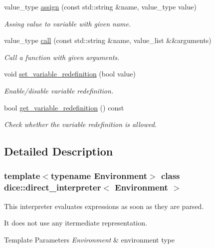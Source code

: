\begin{DoxyCompactItemize}
value\+\_\+type \mbox{\hyperlink{classdice_1_1direct__interpreter_a8ec5df422b6b9175987b7f93c4dd0d7b}{assign}} (const std\+::string \&name, value\+\_\+type value)
\begin{DoxyCompactList}\small\item\em Assing value to variable with given name. \end{DoxyCompactList}\item 
value\+\_\+type \mbox{\hyperlink{classdice_1_1direct__interpreter_afc6a69ed8b3eebb61fc41bccfc7ce725}{call}} (const std\+::string \&name, value\+\_\+list \&\&arguments)
\begin{DoxyCompactList}\small\item\em Call a function with given arguments. \end{DoxyCompactList}\item 
void \mbox{\hyperlink{classdice_1_1direct__interpreter_a41fcd7b8d6d5fd1a3ef3b90856905eae}{set\+\_\+variable\+\_\+redefinition}} (bool value)
\begin{DoxyCompactList}\small\item\em Enable/disable variable redefinition. \end{DoxyCompactList}\item 
bool \mbox{\hyperlink{classdice_1_1direct__interpreter_a5df6a2697cba1b1a1668a7d3f056295b}{get\+\_\+variable\+\_\+redefinition}} () const
\begin{DoxyCompactList}\small\item\em Check whether the variable redefinition is allowed. \end{DoxyCompactList}\end{DoxyCompactItemize}


\subsection{Detailed Description}
\subsubsection*{template$<$typename Environment$>$\newline
class dice\+::direct\+\_\+interpreter$<$ Environment $>$}

This interpreter evaluates expressions as soon as they are parsed. 

It does not use any itermediate representation.


\begin{DoxyTemplParams}{Template Parameters}
{\em Environment} & environment type \\
\hline
\end{DoxyTemplParams}


